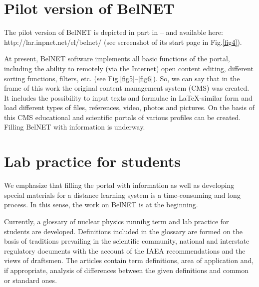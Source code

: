 \documentclass[12pt]{article}
\begin{document}
\section {Pilot version of BelNET}
The pilot version of BelNET is depicted in part in \cite{lanl2014}--\cite{Congress2015}
and available here:
http://lar.inpnet.net/el/belnet/ (see screenshot of its start page
in Fig.\ref{fig4}).

\begin{figure}[htb]
\end{figure}

At present, BelNET software implements all basic functions of the
portal, including the ability to remotely (via the Internet) open
content editing, different sorting functions, filters, etc. (see
Fig.\ref{fig5}--\ref{fig6}). So, we can say that in the frame of
this work the original content management system (CMS) was
created. It includes the possibility to input texts and formulae
in LaTeX-similar form and load different types of files,
references, video, photos and pictures. On the basis of this CMS
educational and scientific portals of various profiles can be
created. Filling BelNET with information is underway.

\begin{figure}[htb]
\end{figure}

\begin{figure}[htb]
\end{figure}

\section {Lab practice for students}
We emphasize that filling the portal with information as well as
developing special materials for a distance learning system is a
time-consuming and long process. In this sense, the work on BelNET
is at the beginning.

Currently, a glossary of nuclear physics runnibg term and lab
practice for students are developed. Definitions included in the
glossary are formed on the basis of traditions prevailing in the
scientific community, national and interstate regulatory documents
with the account of the IAEA recommendations and the views of
draftsmen. The articles contain term definitions, area of
application and, if appropriate, analysis of differences between
the given definitions and common or standard ones.
\end{document}
